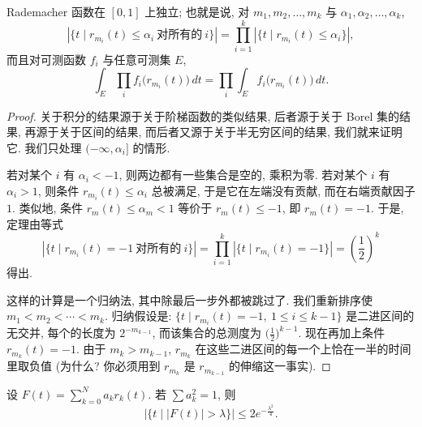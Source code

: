 \begin{theorem}\label{thm:4.9}
Rademacher 函数在 $[0,1]$ 上独立; 也就是说, 对 $m_1,m_2,\ldots,m_k$ 与 $\alpha_1,\allowbreak\alpha_2,\ldots,\alpha_k$,
\[
|\{t \mid r_{m_{i}}(t)\leq\alpha_{i}\ \text{对所有的}\ i\}|=\prod_{i=1}^{k}|\{t \mid r_{m_{i}}(t)\leq\alpha_{i}\}|,
\]
而且对可测函数 $f_i$ 与任意可测集 $E$,
\[
\int_{E}\prod_{i}f_{i}\bigl(r_{m_{i}}(t)\bigr)\,dt=\prod_{i}\int_{E}f_{i}\bigl(r_{m_{i}}(t)\bigr)\,dt.
\]
\end{theorem}

\begin{proof}
关于积分的结果源于关于阶梯函数的类似结果, 后者源于关于 Borel 集的结果, 再源于关于区间的结果, 而后者又源于关于半无穷区间的结果, 我们就来证明它. 我们只处理 $(-\infty,\alpha_i]$ 的情形.

若对某个 $i$ 有 $\alpha_i<-1$, 则两边都有一些集合是空的, 乘积为零. 若对某个 $i$ 有 $\alpha_i>1$, 则条件 $r_{m_i}(t)\leq\alpha_i$ 总被满足, 于是它在左端没有贡献, 而在右端贡献因子 $1$. 类似地, 条件 $r_m(t)\leq\alpha_m<1$ 等价于 $r_m(t)\leq-1$, 即 $r_m(t)=-1$. 于是, 定理由等式
\[
|\{t \mid r_{m_{i}}(t)=-1\ \text{对所有的}\ i\}|
=\prod_{i=1}^{k}|\{t \mid r_{m_{i}}(t)=-1\}|=\left(\frac{1}{2}\right)^{k}
\]
得出.

这样的计算是一个归纳法, 其中除最后一步外都被跳过了. 我们重新排序使 $m_1<m_2<\cdots<m_k$. 归纳假设是: $\{t \mid r_{m_i}(t)=-1,\ 1\leq i\leq k-1\}$ 是二进区间的无交并, 每个的长度为 $2^{-m_{k-1}}$, 而该集合的总测度为 $\bigl(\frac{1}{2}\bigr)^{k-1}$. 现在再加上条件 $r_{m_k}(t)=-1$. 由于 $m_k>m_{k-1}$, $r_{m_k}$ 在这些二进区间的每一个上恰在一半的时间里取负值 (为什么? 你必须用到 $r_{m_k}$ 是 $r_{m_{k-1}}$ 的伸缩这一事实).
\end{proof}

\begin{theorem}\label{thm:4.10}
设 $F(t)=\sum_{k=0}^{N}a_kr_k(t)$. 若 $\sum a_k^2=1$, 则
\[
|\{t \mid |F(t)|>\lambda\}|\leq 2e^{-\frac{\lambda^{2}}{4}}.
\]
\end{theorem}

